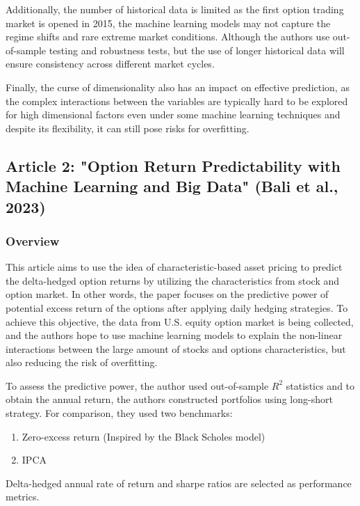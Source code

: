 \documentclass[oneside, 12pt]{article}
\newcommand*{\1}{\text{\scalebox{1.1}{\usefont{U}{bbold}{m}{n}1}}}
\begin{document}
Additionally, the number of historical data is limited as the first option trading market is opened in 2015, the machine learning models may not capture the regime shifts and rare extreme market conditions. Although the authors use out-of-sample testing and robustness tests, but the use of longer historical data will ensure consistency across different market cycles. \newline

Finally, the curse of dimensionality also has an impact on effective prediction, as the complex interactions between the variables are typically hard to be explored for high dimensional factors even under some machine learning techniques and despite its flexibility, it can still pose risks for overfitting. 

\newpage

\subsection{Article 2: "Option Return Predictability with Machine Learning and Big Data" (Bali et al., 2023)}
\subsubsection{Overview}
This article aims to use the idea of characteristic-based asset pricing to predict the delta-hedged option returns by utilizing the characteristics from stock and option market. In other words, the paper focuses on the predictive power of potential excess return of the options after applying daily hedging strategies. To achieve this objective, the data from U.S. equity option market is being collected, and the authors hope to use machine learning models to explain the non-linear interactions between the large amount of stocks and options characteristics, but also reducing the risk of overfitting. \newline

To assess the predictive power, the author used out-of-sample $R^2$ statistics and to obtain the annual return, the authors constructed portfolios using long-short strategy. For comparison, they used two benchmarks: 
\begin{enumerate}
\item Zero-excess return (Inspired by the Black Scholes model)
\item IPCA 
\end{enumerate}
Delta-hedged annual rate of return and sharpe ratios are selected as performance metrics. 
\end{document}
